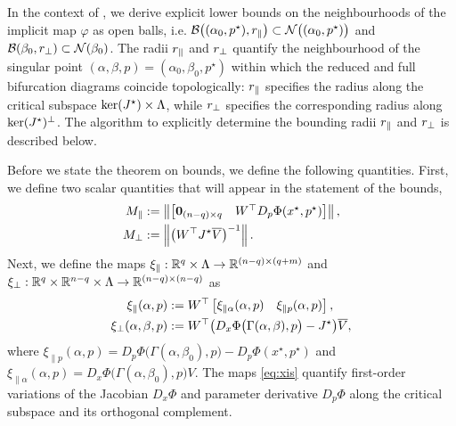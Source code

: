 \documentclass[letterpaper, 10 pt, conference]{ieeeconf}
\begin{document}
In the context of \LSR{}, we derive explicit lower bounds on the neighbourhoods of the implicit map \(\varphi\) as open balls, i.e. \(\mathcal{B}\big((\alpha_0,p^{\star}),\rpr\big) \subset \mathcal{N}\big((\alpha_0,p^{\star})\big)\) and \(\mathcal{B}(\beta_0,\rpp) \subset \mathcal{N}(\beta_0)\). The radii \(\rpr\) and \(\rpp\) quantify the neighbourhood of the singular point \((\alpha,\beta,p) = (\alpha_0,\beta_0,p^{\star})\) within which the reduced and full bifurcation diagrams coincide topologically: \(\rpr\) specifies the radius along the critical subspace \(\kerJ \times \Lambda\), while \(\rpp\) specifies the corresponding radius along \(\kerJ^{\perp}\). The algorithm to explicitly determine the bounding radii \(\rpr\) and \(\rpp\) is described below.

Before we state the theorem on bounds, we define the following quantities.
First, we define two scalar quantities that will appear in the statement of the bounds,
\begin{subequations}
    \begin{align}
        \Mpr & := \norm{\begin{bmatrix}\mathbf{0}_{(n-q) \times q} & W^{\top} D_{p}\Phi(x^{\star},p^{\star})\end{bmatrix}}, \label{def:M_para} \\
        \Mpp & := \norm{\left(W^{\top} J^{\star} \Vbar\right)^{-1}}. \label{def:M_perp}
    \end{align} \label{eq:Ms}%
\end{subequations}
Next, we define the maps \(\xi_{\parallel}: \R[q] \times \Lambda \to \R[(n-q)\times(q+m)]\) and \(\xi_{\perp}: \R[q] \times \R[n-q] \times \Lambda \to \R[(n-q)\times(n-q)]\) as
\begin{subequations}
    \begin{align}
        \xipr{p} & := W^{\top}\begin{bmatrix} \xi_{\parallel\alpha}(\alpha,p) & \xi_{\parallel p}(\alpha,p) \end{bmatrix}, \label{def:xi_para} \\
        \xipp{p} & := W^{\top}\bigl(D_{x}\Phi\bigl(\Gamma(\alpha,\beta),p\bigr) - J^{\star}\bigr) \Vbar ,\label{def:xi_perp}
    \end{align} \label{eq:xis}%
\end{subequations}
where \(\xi_{\parallel p}(\alpha,p) = D_{p}\Phi\bigl(\Gamma(\alpha,\beta_0),p\bigr)-D_{p}\Phi(x^{\star},p^{\star})\) and \(\xi_{\parallel\alpha}(\alpha,p) = D_{x}\Phi\bigl(\Gamma(\alpha,\beta_0),p\bigr)V\).
The maps \eqref{eq:xis} quantify first-order variations of the Jacobian \(D_{x}\Phi\) and parameter derivative \(D_{p}\Phi\) along the critical subspace and its orthogonal complement.
\end{document}
